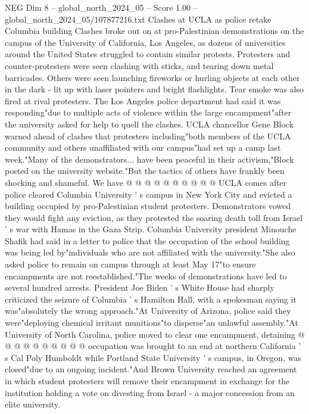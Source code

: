 \begin{textsample}{NEG Dim 8 – global\_north\_2024\_05 – Score 1.00 – global\_north\_2024\_05/107877216.txt}  \label{ex:f8_neg_386}
Clashes at UCLA as police retake Columbia building Clashes broke out on at pro-Palestinian demonstrations on the campus of the University of California, Los Angeles, as dozens of universities around the United States struggled to contain similar protests.
Protesters and counter-protesters were seen clashing with sticks, and tearing down metal barricades.
Others were seen launching fireworks or hurling objects at each other in the dark - lit up with laser pointers and bright flashlights.
Tear smoke was also fired at rival protesters.
The Los Angeles police department had said it was responding"due to multiple acts of violence within the large encampment"after the university asked for help to quell the clashes.
UCLA chancellor Gene Block warned ahead of clashes that protesters including"both members of the UCLA community and others unaffiliated with our campus"had set up a camp last week."Many of the demonstrators... have been peaceful in their activism,"Block posted on the university website."But the tactics of others have frankly been shocking and shameful.
We have @ @ @ @ @ @ @ @ @ @ UCLA comes after police cleared Columbia University ' s campus in New York City and evicted a building occupied by pro-Palestinian student protesters.
Demonstrators vowed they would fight any eviction, as they protested the soaring death toll from Israel ' s war with Hamas in the Gaza Strip.
Columbia University president Minouche Shafik had said in a letter to police that the occupation of the school building was being led by"individuals who are not affiliated with the university."She also asked police to remain on campus through at least May 17"to ensure encampments are not reestablished."The weeks of demonstrations have led to several hundred arrests.
President Joe Biden ' s White House had sharply criticized the seizure of Columbia ' s Hamilton Hall, with a spokesman saying it was"absolutely the wrong approach."At University of Arizona, police said they were"deploying chemical irritant munitions"to disperse"an unlawful assembly."At University of North Carolina, police moved to clear one encampment, detaining @ @ @ @ @ @ @ @ @ @ occupation was brought to an end at northern California ' s Cal Poly Humboldt while Portland State University ' s campus, in Oregon, was closed"due to an ongoing incident."And Brown University reached an agreement in which student protesters will remove their encampment in exchange for the institution holding a vote on divesting from Israel - a major concession from an elite university.

\end{textsample}
